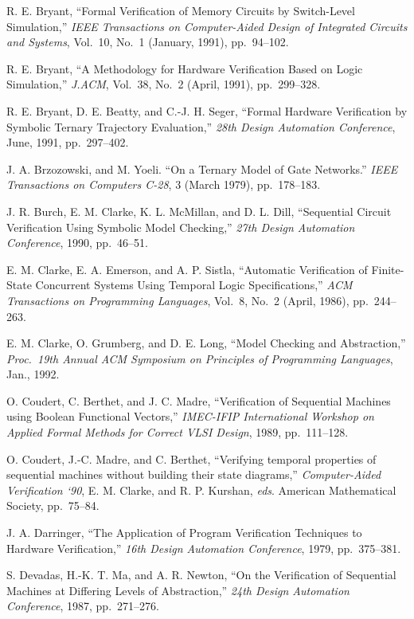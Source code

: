 \begin{thebibliography}{99}
R. E. Bryant,
``Formal Verification of Memory Circuits by Switch-Level Simulation,''
{\it IEEE Transactions on Computer-Aided Design
of Integrated Circuits and Systems}, Vol.~10, No.~1 (January, 1991),
pp.~94--102.

R. E. Bryant, ``A Methodology for Hardware Verification Based on Logic
Simulation,'' {\it J.ACM}, Vol.~38, No.~2 (April, 1991), pp.~299--328.

R. E. Bryant, D. E. Beatty, and C.-J. H. Seger,
``Formal Hardware Verification by Symbolic Ternary Trajectory
Evaluation,''
{\it 28th Design Automation Conference}, June, 1991, pp.~297--402.


J. A. Brzozowski, and M. Yoeli.
``On a Ternary Model of Gate Networks.''
{\it IEEE Transactions on Computers C-28}, 3 (March 1979),
pp.~178--183.

J. R. Burch, E. M. Clarke, K. L. McMillan, and D. L. Dill,
``Sequential Circuit Verification Using Symbolic Model Checking,''
{\it 27th Design Automation Conference}, 1990, pp.~46--51.

E. M. Clarke, E. A. Emerson, and A. P. Sistla,
``Automatic Verification of Finite-State Concurrent Systems Using Temporal
Logic Specifications,''
{\em ACM Transactions on Programming Languages},
Vol.~8, No.~2 (April, 1986), pp.~244--263.

E. M. Clarke, O. Grumberg, and D. E. Long,
``Model Checking and Abstraction,''
{\em Proc.~19th Annual ACM Symposium on Principles of Programming Languages},
Jan., 1992.

O. Coudert, C. Berthet, and J. C. Madre,
``Verification of Sequential Machines using Boolean Functional Vectors,''
{\it IMEC-IFIP International Workshop on Applied Formal Methods for Correct
VLSI Design}, 1989, pp.~111--128.

O. Coudert, J.-C. Madre, and C. Berthet,
``Verifying temporal properties of sequential machines without
building their state diagrams,''
{\it Computer-Aided Verification `90}, E. M. Clarke, and
R. P. Kurshan, {\em eds}.
American Mathematical Society, pp.~75--84.

J. A. Darringer,
``The Application of Program Verification Techniques to Hardware
Verification,''
{\it 16th Design Automation Conference}, 1979, pp.~375--381.

S. Devadas, H.-K. T. Ma, and A. R. Newton,
``On the Verification of Sequential Machines at Differing Levels of
Abstraction,''
{\it 24th Design Automation Conference}, 1987, pp.~271--276.


\end{thebibliography}
